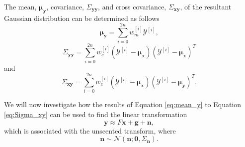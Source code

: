 \documentclass[12pt,oneside,openany,a4paper, %
afrikaans,english,
]{memoir}
\numberwithin{equation}{chapter}
\begin{document}
The mean, $\bm{\mu_{y}}$, covariance, $\Sigma_{\bm{yy}}$, and cross covariance, $\Sigma_{\bm{xy}}$, of the resultant Gaussian distribution can be determined as follows
\begin{equation}\label{eq:mean_y}
\bm{\mu}_{\bm{y}} = \sum_{i = 0}^{2n}w_m^{[i]}\mathcal{Y}^{[i]},
\end{equation}
\begin{equation}\label{eq:Sigma_yy}
\Sigma_{\bm{yy}} = \sum_{i=0}^{2n}w_c^{[i]}\left(\mathcal{Y}^{[i]} - \bm{\mu_{x}}\right) \left(\mathcal{Y}^{[i]} - \bm{\mu_{x}}\right)^T
\end{equation}
and
\begin{equation}\label{eq:Sigma_xy}
\Sigma_{\bm{xy}}= \sum_{i=0}^{2n}w_c^{[i]}\left(\mathcal{Y}^{[i]} - \bm{\mu_{x}}\right) \left(\mathcal{Y}^{[i]} - \bm{\mu_{y}}\right)^T.
\end{equation}

We will now investigate how the results of Equation \ref{eq:mean_y} to Equation \ref{eq:Sigma_xy} can be used to find the linear transformation 
\begin{equation}\label{eq:linearTransform}
\bm{y} \approx F\bm{x} + \bm{g} + \bm{n},
\end{equation}
which is associated with the unscented transform,
where
\begin{equation}
\bm{n} \sim \mathcal{N}(\bm{n}; \bm{0}, \Sigma_{\bm{n}}).
\end{equation}
\end{document}
